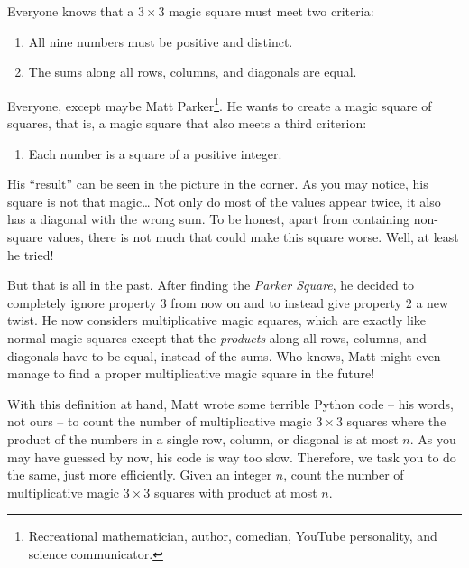 


Everyone knows that a $3\times3$ magic square must meet two criteria:
\begin{enumerate}
	\item All nine numbers must be positive and distinct.
	\item The sums along all rows, columns, and diagonals are equal.
\end{enumerate}
Everyone, except  maybe Matt Parker\footnote{Recreational mathematician, author, comedian, YouTube personality, and science communicator.}.
He wants to create a magic square of squares, that is, a magic square that also meets a third criterion:
\begin{enumerate}[resume]
	\item Each number is a square of a positive integer.
\end{enumerate}
His ``result'' can be seen in the picture in the corner.
As you may notice, his square is not that magic\dots{}
Not only do most of the values appear twice, it also has a diagonal with the wrong sum.
To be honest, apart from containing non-square values, there is not much that could make this square worse.
Well, at least he tried!

But that is all in the past.
After finding the \emph{Parker Square}, he decided to completely ignore property $3$ from now on and to instead give property $2$ a new twist.
He now considers multiplicative magic squares, which are exactly like normal magic squares except that the \emph{products} along all rows, columns, and diagonals have to be equal, instead of the sums.
Who knows, Matt might even manage to find a proper multiplicative magic square in the future!

With this definition at hand, Matt wrote some terrible Python code -- his words, not ours -- to count the number of multiplicative magic $3\times 3$ squares where the product of the numbers in a single row, column, or diagonal is at most $n$.
As you may have guessed by now, his code is way too slow.
Therefore, we task you to do the same, just more efficiently.
Given an integer $n$, count the number of multiplicative magic $3\times 3$ squares with product at most $n$.

